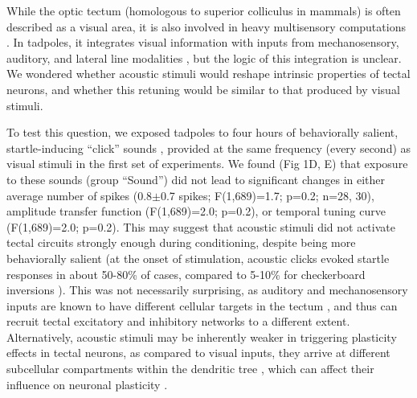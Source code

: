 \documentclass{article}
\begin{document}
While the optic tectum (homologous to superior colliculus in mammals) is often described as a visual area, it is also involved in heavy multisensory computations \citep{stein2014}. In tadpoles, it integrates visual information with inputs from mechanosensory, auditory, and lateral line modalities \citep{deeg2009,pratt2009trigeminal,hiramoto2009,felch2016,truszkowski2017}, but the logic of this integration is unclear. We wondered whether acoustic stimuli would reshape intrinsic properties of tectal neurons, and whether this retuning would be similar to that produced by visual stimuli. 

To test this question, we exposed tadpoles to four hours of behaviorally salient, startle-inducing “click” sounds \citep{james2015,truszkowski2017}, provided at the same frequency (every second) as visual stimuli in the first set of experiments. We found (Fig 1D, E) that exposure to these sounds (group “Sound”) did not lead to significant changes in either average number of spikes (0.8$\pm$0.7 spikes; F(1,689)=1.7; p=0.2; n=28, 30), amplitude transfer function (F(1,689)=2.0; p=0.2), or temporal tuning curve (F(1,689)=2.0; p=0.2). This may suggest that acoustic stimuli did not activate tectal circuits strongly enough during conditioning, despite being more behaviorally salient (at the onset of stimulation, acoustic clicks evoked startle responses in about 50-80\% of cases, compared to 5-10\% for checkerboard inversions \citep{james2015,truszkowski2017}). This was not necessarily surprising, as auditory and mechanosensory inputs are known to have different cellular targets in the tectum \citep{pratt2009trigeminal,felch2016,truszkowski2017}, and thus can recruit tectal excitatory and inhibitory networks to a different extent. Alternatively, acoustic stimuli may be inherently weaker in triggering plasticity effects in tectal neurons, as compared to visual inputs, they arrive at different subcellular compartments within the dendritic tree \citep{hiramoto2009,deeg2009}, which can affect their influence on neuronal plasticity \citep{richards2019dendritic}.
\end{document}
